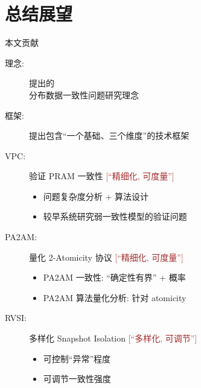 \section{总结展望}

\begin{frame}{本文贡献}
  \begin{description}
	\item[理念:] 提出\idea{}的\\分布数据一致性问题研究理念
	\item[框架:] 提出包含``一个基础、三个维度''的技术框架 
	  \pause
	  \vspace{0.20cm}
	\item[VPC:] 验证 PRAM 一致性 \hfill \textcolor{brown}{\scriptsize [``精细化, 可度量'']}
	  \begin{itemize}
		\item 问题复杂度分析 + 算法设计
		\item 较早系统研究弱一致性模型的验证问题
	  \end{itemize}
	  \pause
	\item[PA2AM:] 量化 2-Atomicity 协议 \hfill \textcolor{brown}{\scriptsize [``精细化, 可度量'']} 
	  \begin{itemize}
		\item PA2AM 一致性: ``确定性有界'' + 概率
		\item PA2AM 算法量化分析: 针对 atomicity
	  \end{itemize}
	  \pause
	\item[RVSI:] 多样化 Snapshot Isolation \hfill \textcolor{brown}{\scriptsize [``多样化, 可调节'']}
	  \begin{itemize}
		\item 可控制``异常''程度
		\item 可调节一致性强度
	  \end{itemize}
  \end{description}
\end{frame}
